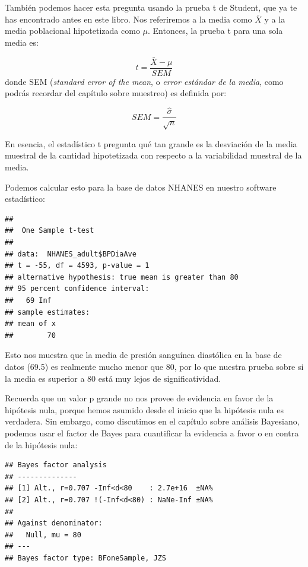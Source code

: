 \documentclass[
  12pt,
]{book}
\newenvironment{Shaded}{\begin{snugshade}}{\end{snugshade}}
\newcommand{\AttributeTok}[1]{\textcolor[rgb]{0.77,0.63,0.00}{#1}}
\newcommand{\ConstantTok}[1]{\textcolor[rgb]{0.00,0.00,0.00}{#1}}
\newcommand{\DecValTok}[1]{\textcolor[rgb]{0.00,0.00,0.81}{#1}}
\newcommand{\FunctionTok}[1]{\textcolor[rgb]{0.00,0.00,0.00}{#1}}
\newcommand{\NormalTok}[1]{#1}
\newcommand{\SpecialCharTok}[1]{\textcolor[rgb]{0.00,0.00,0.00}{#1}}
\theoremstyle{definition}
\theoremstyle{definition}
\theoremstyle{definition}
\theoremstyle{remark}
\begin{document}
También podemos hacer esta pregunta usando la prueba t de Student, que ya te has encontrado antes en este libro. Nos referiremos a la media como \(\bar{X}\) y a la media poblacional hipotetizada como \(\mu\). Entonces, la prueba t para una sola media es:

\[
t = \frac{\bar{X} - \mu}{SEM}
\]
donde SEM (\emph{standard error of the mean}, o \emph{error estándar de la media}, como podrás recordar del capítulo sobre muestreo) es definida por:

\[
SEM = \frac{\hat{\sigma}}{\sqrt{n}}
\]

En esencia, el estadístico t pregunta qué tan grande es la desviación de la media muestral de la cantidad hipotetizada con respecto a la variabilidad muestral de la media.

Podemos calcular esto para la base de datos NHANES en nuestro software estadístico:

\begin{verbatim}
## 
## 	One Sample t-test
## 
## data:  NHANES_adult$BPDiaAve
## t = -55, df = 4593, p-value = 1
## alternative hypothesis: true mean is greater than 80
## 95 percent confidence interval:
##   69 Inf
## sample estimates:
## mean of x 
##        70
\end{verbatim}

Esto nos muestra que la media de presión sanguínea diastólica en la base de datos (69.5) es realmente mucho menor que 80, por lo que nuestra prueba sobre si la media es superior a 80 está muy lejos de significatividad.

Recuerda que un valor p grande no nos provee de evidencia en favor de la hipótesis nula, porque hemos asumido desde el inicio que la hipótesis nula es verdadera. Sin embargo, como discutimos en el capítulo sobre análisis Bayesiano, podemos usar el factor de Bayes para cuantificar la evidencia a favor o en contra de la hipótesis nula:

\begin{Shaded}
\end{Shaded}

\begin{verbatim}
## Bayes factor analysis
## --------------
## [1] Alt., r=0.707 -Inf<d<80    : 2.7e+16  ±NA%
## [2] Alt., r=0.707 !(-Inf<d<80) : NaNe-Inf ±NA%
## 
## Against denominator:
##   Null, mu = 80 
## ---
## Bayes factor type: BFoneSample, JZS
\end{verbatim}
\end{document}
